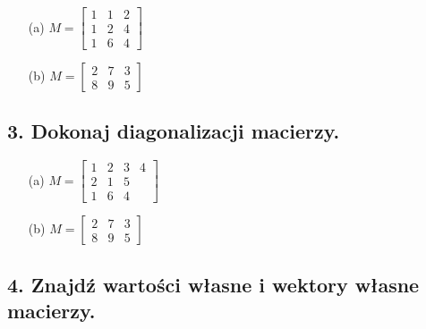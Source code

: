 \begin{enumerate}
    \item[(a)] \( M = \begin{bmatrix} 1 & 1 & 2 \\ 1 & 2 & 4 \\ 1 & 6 & 4 \end{bmatrix} \)
    
    \item[(b)] \( M = \begin{bmatrix} 2 & 7 & 3 \\ 8 & 9 & 5 \end{bmatrix} \)
\end{enumerate}

\subsection*{3. Dokonaj diagonalizacji macierzy.}

\begin{enumerate}
    \item[(a)] \( M = \begin{bmatrix} 1 & 2 & 3 & 4 \\ 2 & 1 & 5 \\ 1 & 6 & 4 \end{bmatrix} \)
    
    \item[(b)] \( M = \begin{bmatrix} 2 & 7 & 3 \\ 8 & 9 & 5 \end{bmatrix} \)
\end{enumerate}

\subsection*{4. Znajdź wartości własne i wektory własne macierzy.}

